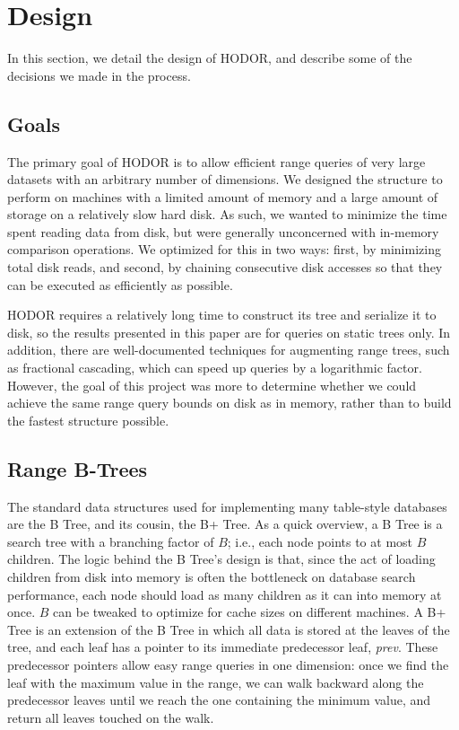 \documentclass[11pt, oneside]{article}
\newcommand{\ms}{\textit}
\begin{document}
\section{Design}

In this section, we detail the design of HODOR, and describe some of the
decisions we made in the process.

\subsection{Goals}

The primary goal of HODOR is to allow efficient range queries of very large
datasets with an arbitrary number of dimensions. We designed the structure to
perform on machines with a limited amount of memory and a large amount of
storage on a relatively slow hard disk. As such, we wanted to minimize the
time spent reading data from disk, but were generally unconcerned with
in-memory comparison operations. We optimized for this in two ways: first, by
minimizing total disk reads, and second, by chaining consecutive disk accesses
so that they can be executed as efficiently as possible. 

HODOR requires a relatively long time to construct its tree and serialize it to
disk, so the results presented in this paper are for queries on static trees
only. In addition, there are well-documented techniques for augmenting range
trees, such as fractional cascading, which can speed up queries by a logarithmic
factor. However, the goal of this project was more to determine whether we could
achieve the same range query bounds on disk as in memory, rather than to build
the fastest structure possible.

\subsection{Range B-Trees}

The standard data structures used for implementing many table-style databases
are the B Tree, and its cousin, the B+ Tree. As a quick overview, a B Tree is a
search tree with a branching factor of $B$; i.e., each node points to at most
$B$ children. The logic behind the B Tree's design is that, since the act of
loading children from disk into memory is often the bottleneck on database
search performance, each node should load as many children as it can into memory
at once. $B$ can be tweaked to optimize for cache sizes on different machines.
A B+ Tree is an extension of the B Tree in which all data is stored at the
leaves of the tree, and each leaf has a pointer to its immediate predecessor
leaf, \ms{prev}. These predecessor pointers allow easy range queries in one
dimension: once we find the leaf with the maximum value in the range, we can
walk backward along the predecessor leaves until we reach the one containing the
minimum value, and return all leaves touched on the walk.
\end{document}
